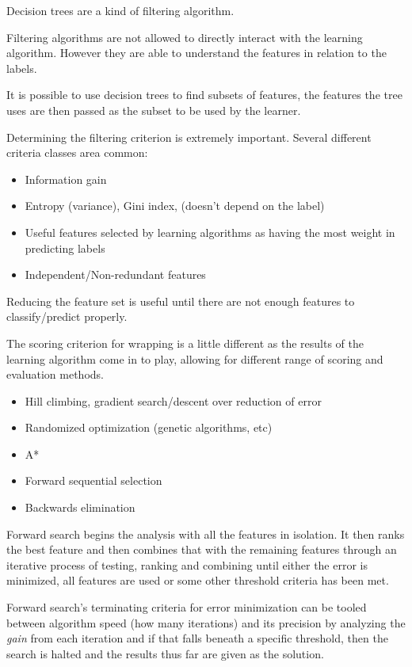 \documentclass{article}
\begin{document}
Decision trees are a kind of filtering algorithm. 

Filtering algorithms are not allowed to directly interact with the learning 
algorithm. However they are able to understand the features in relation to the 
labels. 

It is possible to use decision trees to find subsets of features, the features
the tree uses are then passed as the subset to be used by the learner. 

Determining the filtering criterion is extremely important. Several different
criteria classes area common:
\begin{itemize}
	\item Information gain
	\item Entropy (variance), Gini index,  (doesn't depend on the label)
	\item Useful features selected by learning algorithms as having the most
		weight in predicting labels
	\item Independent/Non-redundant features
\end{itemize}

Reducing the feature set is useful until there are not enough features to 
classify/predict properly. 

The scoring criterion for wrapping is a little different as the results of the 
learning algorithm come in to play, allowing for different range of scoring and
evaluation methods. 

\begin{itemize}
	\item Hill climbing, gradient search/descent over reduction of error
	\item Randomized optimization (genetic algorithms, etc)
	\item A*
	\item Forward sequential selection
	\item Backwards elimination
\end{itemize}

Forward search begins the analysis with all the features in isolation. It then 
ranks the best feature and then combines that with the remaining features 
through an iterative process of testing, ranking and combining until either 
the error is minimized, all features are used or some other threshold criteria
has been met. 

Forward search's terminating criteria for error minimization can be tooled
between algorithm speed (how many iterations) and its precision by analyzing the 
\emph{gain} from each iteration and if that falls beneath a specific threshold, 
then the search is halted and the results thus far are given as the solution. 
\end{document}
